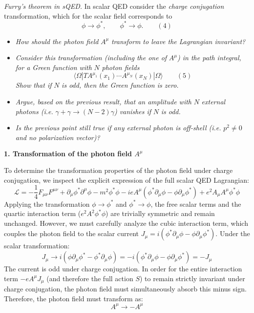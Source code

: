 \begin{center}
    \textit{Furry's theorem in sQED.} In scalar QED consider the \textit{charge conjugation} transformation, which for the scalar field corresponds to
    \[
        \phi \to \phi^*, \qquad \phi^* \to \phi. \qquad (4)
    \]
    \begin{itemize}
        \item \textit{How should the photon field} $A^\mu$ \textit{transform to leave the Lagrangian invariant?}
        \item \textit{Consider this transformation (including the one of} $A^\mu$\textit{) in the path integral, for a Green function with} $N$ \textit{photon fields}
              \[
                  \langle \Omega | T A^{\mu_1}(x_1) \cdots A^{\mu_N}(x_N) | \Omega \rangle \qquad (5)
              \]
              \textit{Show that if} $N$ \textit{is odd, then the Green function is zero.}
        \item \textit{Argue, based on the previous result, that an amplitude with} $N$ \textit{external photons (i.e. } $\gamma + \gamma \to (N-2)\gamma$\textit{) vanishes if } $N$ \textit{ is odd.}
        \item \textit{Is the previous point still true if any external photon is off-shell (i.e. } $p^2 \neq 0$ \textit{ and no polarization vector)?}
    \end{itemize}
\end{center}

\textbf{1. Transformation of the photon field $A^\mu$}

To determine the transformation properties of the photon field under charge conjugation, we inspect the explicit expression of the full scalar QED Lagrangian:
\[
    \mathcal{L} = -\frac{1}{4}F_{\mu\nu}F^{\mu\nu} + \partial_\mu \phi^* \partial^\mu \phi - m^2 \phi^* \phi - ie A^\mu (\phi^* \partial_\mu \phi - \phi \partial_\mu \phi^*) + e^2 A_\mu A^\mu \phi^* \phi
\]
Applying the transformation $\phi \to \phi^*$ and $\phi^* \to \phi$, the free scalar terms and the quartic interaction term ($e^2 A^2 \phi^* \phi$) are trivially symmetric and remain unchanged. However, we must carefully analyze the cubic interaction term, which couples the photon field to the scalar current $J_\mu = i(\phi^* \partial_\mu \phi - \phi \partial_\mu \phi^*)$. Under the scalar transformation:
\[
    J_\mu \to i(\phi \partial_\mu \phi^* - \phi^* \partial_\mu \phi) = -i(\phi^* \partial_\mu \phi - \phi \partial_\mu \phi^*) = -J_\mu
\]
The current is odd under charge conjugation. In order for the entire interaction term $-e A^\mu J_\mu$ (and therefore the full action $S$) to remain strictly invariant under charge conjugation, the photon field must simultaneously absorb this minus sign. Therefore, the photon field must transform as:
\[
    A^\mu \to -A^\mu
\]

